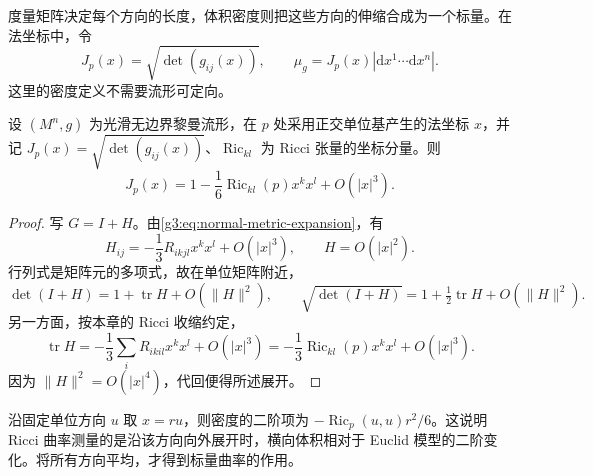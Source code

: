 度量矩阵决定每个方向的长度，体积密度则把这些方向的伸缩合成为一个标量。在法坐标中，令
\[
	J_p(x)=\sqrt{\det(g_{ij}(x))},\qquad
	\mu_g=J_p(x)|\mathrm dx^1\cdots\mathrm dx^n|.
\]
这里的密度定义不需要流形可定向。

\begin{proposition}\label{g3:prop:normal-volume-density}
	设 \((M^n,g)\) 为光滑无边界黎曼流形，在 \(p\) 处采用正交单位基产生的法坐标 \(x\)，并记 \(J_p(x)=\sqrt{\det(g_{ij}(x))}\)、\(\operatorname{Ric}_{kl}\) 为 Ricci 张量的坐标分量。则
	\begin{equation}\label{g3:eq:normal-volume-density}
		J_p(x)=1-\frac16\operatorname{Ric}_{kl}(p)x^kx^l+O(|x|^3).
	\end{equation}
\end{proposition}
\begin{proof}
	写 \(G=I+H\)。由\eqref{g3:eq:normal-metric-expansion}，有
	\[
		H_{ij}=-\frac13R_{ikjl}x^kx^l+O(|x|^3),
		\qquad H=O(|x|^2).
	\]
	行列式是矩阵元的多项式，故在单位矩阵附近，
	\[
		\det(I+H)=1+\operatorname{tr}H+O(\|H\|^2),
		\qquad
		\sqrt{\det(I+H)}=1+\tfrac12\operatorname{tr}H+O(\|H\|^2).
	\]
	另一方面，按本章的 Ricci 收缩约定，
	\[
		\operatorname{tr}H
		=-\frac13\sum_iR_{ikil}x^kx^l+O(|x|^3)
		=-\frac13\operatorname{Ric}_{kl}(p)x^kx^l+O(|x|^3).
	\]
	因为 \(\|H\|^2=O(|x|^4)\)，代回便得所述展开。
\end{proof}

沿固定单位方向 \(u\) 取 \(x=ru\)，则密度的二阶项为 \(-\operatorname{Ric}_p(u,u)r^2/6\)。这说明 Ricci 曲率测量的是沿该方向向外展开时，横向体积相对于 Euclid 模型的二阶变化。将所有方向平均，才得到标量曲率的作用。

